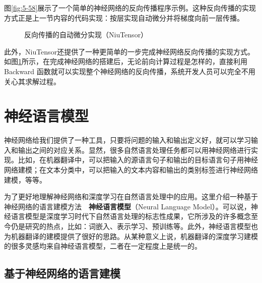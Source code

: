\parinterval  图\ref{fig:5-58}展示了一个简单的神经网络的反向传播程序示例。这种反向传播的实现方式正是上一节内容的代码实现：按层实现自动微分并将梯度向前一层传播。
\begin{figure}[htp]
\centering

\caption{反向传播的自动微分实现（NiuTensor）}
\label{fig:5-59}
\end{figure}

\parinterval  此外，NiuTensor还提供了一种更简单的一步完成神经网络反向传播的实现方式。如图\ref{fig:5-59}所示，在完成神经网络的搭建后，无论前向计算过程是怎样的，直接利用Backward 函数就可以实现整个神经网络的反向传播，系统开发人员可以完全不用关心其求解过程。


\sectionnewpage
\section{神经语言模型}\label{sec5:nlm}

\parinterval  神经网络给我们提供了一种工具，只要将问题的输入和输出定义好，就可以学习输入和输出之间的对应关系。显然，很多自然语言处理任务都可以用神经网络进行实现。比如，在机器翻译中，可以把输入的源语言句子和输出的目标语言句子用神经网络建模；在文本分类中，可以把输入的文本内容和输出的类别标签进行神经网络建模，等等。

\parinterval  为了更好地理解神经网络和深度学习在自然语言处理中的应用。这里介绍一种基于神经网络的语言建模方法\ \dash \ {\small\sffamily\bfseries{神经语言模型}}（Neural Language Model）。可以说，神经语言模型是深度学习时代下自然语言处理的标志性成果，它所涉及的许多概念至今仍是研究的热点，比如：词嵌入、表示学习、预训练等。此外，神经语言模型也为机器翻译的建模提供了很好的思路。从某种意义上说，机器翻译的深度学习建模的很多灵感均来自神经语言模型，二者在一定程度上是统一的。


\subsection{基于神经网络的语言建模}

